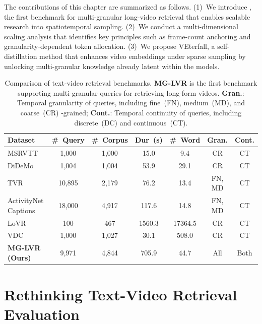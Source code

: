 The contributions of this chapter are summarized as follows.
(1)~We introduce \benchmarkname, the first benchmark for multi-granular long-video retrieval that enables scalable research into spatiotemporal sampling.
(2)~We conduct a multi-dimensional scaling analysis that identifies key principles such as frame-count anchoring and granularity-dependent token allocation.
(3)~We propose VEterfall, a self-distillation method that enhances video embeddings under sparse sampling by unlocking multi-granular knowledge already latent within the models.


\begin{table}[t]
    \centering
    \caption{Comparison of text-video retrieval benchmarks. \textbf{MG-LVR} is the first benchmark supporting multi-granular queries for retrieving long-form videos. \textbf{Gran.}: Temporal granularity of queries, including fine~(FN), medium~(MD), and coarse~(CR) -grained; \textbf{Cont.}: Temporal continuity of queries, including discrete~(DC) and continuous~(CT).}
    \label{mglvr:tab:benchmark_comparison}
    \setlength{\tabcolsep}{2.5pt}
    \begin{tabular}{@{}l*{6}{c}@{}}
    \toprule
    \textbf{Dataset} & \textbf{\#~Query} & \textbf{\#~Corpus} & \textbf{Dur~(s)} & \textbf{\#~Word} & \textbf{Gran.} & \textbf{Cont.} \\
    \midrule
    MSRVTT~\cite{xu2016msr} & 1,000 & 1,000 & 15.0 & 9.4 & CR & CT \\
    DiDeMo~\cite{anne2017localizing} & 1,004 & 1,004 & 53.9 & 29.1 & CR & CT \\
    TVR~\cite{lei2020tvr} & 10,895 & 2,179 & 76.2 & 13.4 & FN, MD & CT \\
    ActivityNet Captions~\cite{krishna2017dense} & 18,000 & 4,917 & 117.6 & 14.8 & FN, MD & CT \\
    LoVR~\cite{cai2025lovr} & 100 & 467 & 1560.3 & 17364.5 & CR & CT \\
    VDC~\cite{chai2024auroracap} & 1,000 & 1,027 & 30.1 & 508.0 & CR & CT \\
    \midrule
    \textbf{MG-LVR (Ours)} & 9,971 & 4,844 & 705.9 & 44.7 & All & Both \\
    \bottomrule
    \end{tabular}
\end{table}

\section{Rethinking Text-Video Retrieval Evaluation}
\label{mglvr:sec:benchmark}

